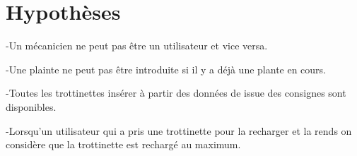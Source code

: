 \documentclass{article}
\begin{document}
\section{Hypothèses}
-Un mécanicien ne peut pas être un utilisateur et vice versa.

-Une plainte ne peut pas être introduite si il y a déjà une plante en cours.

-Toutes les trottinettes insérer à partir des données de issue des consignes sont disponibles.

-Lorsqu'un utilisateur qui a pris une trottinette pour la recharger et la rends on considère que la trottinette est rechargé au maximum. 
\end{document}
